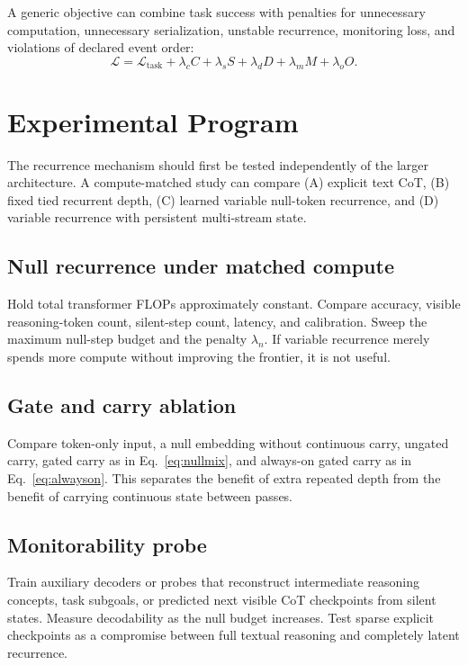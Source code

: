 \documentclass[10pt,twocolumn]{article}
\begin{document}
A generic objective can combine task success with penalties for unnecessary computation, unnecessary serialization, unstable recurrence, monitoring loss, and violations of declared event order:
\begin{equation}
\mathcal L = \mathcal L_{\mathrm{task}} +
\lambda_c C + \lambda_s S + \lambda_d D + \lambda_m M + \lambda_o O.
\end{equation}

\section{Experimental Program}

The recurrence mechanism should first be tested independently of the larger architecture. A compute-matched study can compare (A) explicit text CoT, (B) fixed tied recurrent depth, (C) learned variable null-token recurrence, and (D) variable recurrence with persistent multi-stream state.

\subsection{Null recurrence under matched compute}
Hold total transformer FLOPs approximately constant. Compare accuracy, visible reasoning-token count, silent-step count, latency, and calibration. Sweep the maximum null-step budget and the penalty $\lambda_n$. If variable recurrence merely spends more compute without improving the frontier, it is not useful.

\subsection{Gate and carry ablation}
Compare token-only input, a null embedding without continuous carry, ungated carry, gated carry as in Eq.~\ref{eq:nullmix}, and always-on gated carry as in Eq.~\ref{eq:alwayson}. This separates the benefit of extra repeated depth from the benefit of carrying continuous state between passes.

\subsection{Monitorability probe}
Train auxiliary decoders or probes that reconstruct intermediate reasoning concepts, task subgoals, or predicted next visible CoT checkpoints from silent states. Measure decodability as the null budget increases. Test sparse explicit checkpoints as a compromise between full textual reasoning and completely latent recurrence.
\end{document}
